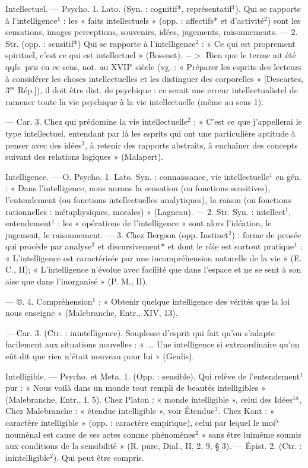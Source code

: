 Intellectuel. — Psycho. 1. Lato. (Syn. :
cognitif*, représentatif$^1$). Qui se rapporte à l'intelligence$^1$ : les « faits
intellectuels » (opp. : affectifs* et
d'activité$^2$) sont les sensations, images
perceptions, souvenirs, idées, jugements, raisonnements. — 2. Str.
(opp. : sensitif*) Qui se rapporte à
l'intelligence$^2$ : « Ce qui est proprement spirituel, c’est ce qui est intellectuel » (Bossuet). $->$ Bien que le
terme ait été qqfs. pris en ce sens,
not. au {\footnotesize XVII}$^\text{e}$ siècle (vg. : « Préparer
les esprits des lecteurs à considérer
les choses intellectuelles et les distinguer des corporelles » [Descartes,
3$^\text{es}$ Rép.]), il doit être dist. de psychique : ce serait une erreur intellectualistel de ramener toute la vie
psychique à la vie intellectuelle
(même au sens 1).

— Car. 3. Chez qui prédomine la
vie intellectuelle$^2$ : « C'est ce que
j'appellerai le type intellectuel, entendant par là les esprits qui ont une
particulière aptitude à penser avec des
idées$^3$, à retenir des rapports abstraits,
à enchaîner des concepts suivant
des relations logiques » (Malapert).

Intelligence. — O. Psycho. 1. Lato.
Syn. : connaissance, vie intellectuelle$^1$ en gén. : « Dans l'intelligence,
nous aurons la sensation (ou fonctions sensitives), l’entendement (ou
fonctions intellectuelles analytiques),
la raison (ou fonctions rationnelles :
métaphysiques, morales) » (Lagneau). — 2. Str. Syn. : intellect$^1$,
entendement$^1$ : les « opérations de
l'intelligence » sont alors l’idéation,
le jugement, le raisonnement. —
3. Chez Bergson (opp. Instinct$^2$) :
forme de pensée qui procède par
analyse$^3$ et discursivement* et dont
le rôle est surtout pratique$^1$ : « L’intelligence est caractérisée par une
incompréhension naturelle de la
vie » (E. C., II); « L'intelligence
n’évolue avec facilité que dans
l’espace et ne se sent à son aise que
dans l'inorganisé » (P. M., II).

— ®. 4. Compréhension$^1$ : « Obtenir quelque intelligence des vérités
que la loi nous enseigne » (Malebranche, Entr., {\footnotesize XIV}, 13).

— Car. 3. (Ctr. : inintelligence).
Souplesse d’esprit qui fait qu'on
s'adapte facilement aux situations
nouvelles : « ... Une intelligence si
extraordinaire qu'on eût dit que
rien n'était nouveau pour lui »
(Genlis).

Intelligible. — Psycho. et Meta. 1.
(Opp. : sensible). Qui relève de l’entendement$^1$ pur : « Nous voilà dans
un monde tout rempli de beautés
intelligibles » (Malebranche, Entr.,
I, 5). Chez Platon : « monde intelligible », celui des Idées$^{1a}$, Chez Malebranche : « étendue intelligible »,
voir Étendue$^3$. Chez Kant : « caractère intelligible » (opp. : caractère
empirique), celui par lequel le moi$^5$
nouménal est cause de ses actes
comme phénomènes$^2$ « sans être luimême soumis aux conditions de la
sensibilité » (R. pure, Dial., II, 2,
9, § 3). — Épist. 2. (Ctr. : inintelligible$^2$). Qui peut être compris.

